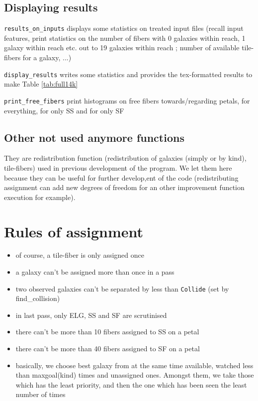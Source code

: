 \documentclass[10pt]{extarticle}
\begin{document}
\begin{multicols}{2}
\subsection{Displaying results}
{\tt results\_on\_inputs} displays some statistics on treated input files (recall input features, print statistics on the number of fibers with 0 galaxies within reach, 1 galaxy within reach etc. out to 19 galaxies within reach ; number of available tile-fibers for a galaxy, ...)

{\tt display\_results} writes some statistics and provides the tex-formatted results to make Table \ref{tab:full14k}

{\tt print\_free\_fibers} print histograms on free fibers towards/regarding petals, for everything, for only SS and for only SF


\subsection{Other not used anymore functions}
They are redistribution function (redistribution of galaxies (simply or by kind), tile-fibers) used in previous development of the program. We let them here because they can be useful for further develop,ent of the code (redistributing assignment can add new degrees of freedom for an other improvement function execution for example).


\section{Rules of assignment}
\begin{itemize}
	\item of course, a tile-fiber is only assigned once
	\item a galaxy can't be assigned more than once in a pass
	\item two observed galaxies can't be separated by less than {\tt Collide} (set by find\_collision)
	\item in last pass, only ELG, SS and SF are scrutinised
	\item there can't be more than 10 fibers assigned to SS on a petal
	\item there can't be more than 40 fibers assigned to SF on a petal
	\item basically, we choose best galaxy from at the same time available, watched less than maxgoal(kind) times and unassigned ones. Amongst them, we take those which has the least priority, and then the one which has been seen the least number of times
\end{itemize}


\end{multicols}
\end{document}

